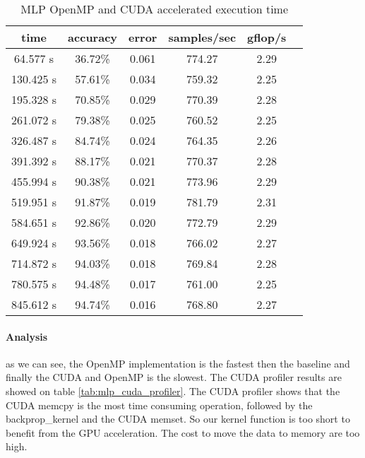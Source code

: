 \documentclass[11pt]{article}
\begin{document}
\begin{table}[h]	\centering
	\begin{tabular}{|c|c|c|c|c|c|}
		\hline
		\textbf{time} & \textbf{accuracy} & \textbf{error} & \textbf{samples/sec} & \textbf{gflop/s} \\ \hline
		64.577 s      & 36.72\%           & 0.061          & 774.27               & 2.29             \\ \hline
		130.425 s     & 57.61\%           & 0.034          & 759.32               & 2.25             \\ \hline
		195.328 s     & 70.85\%           & 0.029          & 770.39               & 2.28             \\ \hline
		261.072 s     & 79.38\%           & 0.025          & 760.52               & 2.25             \\ \hline
		326.487 s     & 84.74\%           & 0.024          & 764.35               & 2.26             \\ \hline
		391.392 s     & 88.17\%           & 0.021          & 770.37               & 2.28             \\ \hline
		455.994 s     & 90.38\%           & 0.021          & 773.96               & 2.29             \\ \hline
		519.951 s     & 91.87\%           & 0.019          & 781.79               & 2.31             \\ \hline
		584.651 s     & 92.86\%           & 0.020          & 772.79               & 2.29             \\ \hline
		649.924 s     & 93.56\%           & 0.018          & 766.02               & 2.27             \\ \hline
		714.872 s     & 94.03\%           & 0.018          & 769.84               & 2.28             \\ \hline
		780.575 s     & 94.48\%           & 0.017          & 761.00               & 2.25             \\ \hline
		845.612 s     & 94.74\%           & 0.016          & 768.80               & 2.27             \\ \hline
	\end{tabular}
	\caption{MLP OpenMP and CUDA accelerated execution time}
	\label{tab:mlp_accelerated_cuda}
\end{table}

\paragraph*{Analysis} as we can see, the OpenMP implementation is the fastest then the baseline and finally the CUDA and OpenMP is the slowest.
The CUDA profiler results are showed on table \ref{tab:mlp_cuda_profiler}.
The CUDA profiler shows that the CUDA memcpy is the most time consuming operation, followed by the backprop\_kernel and the CUDA memset.
So our kernel function is too short to benefit from the GPU acceleration. The cost to move the data to memory are too high.
\end{document}
